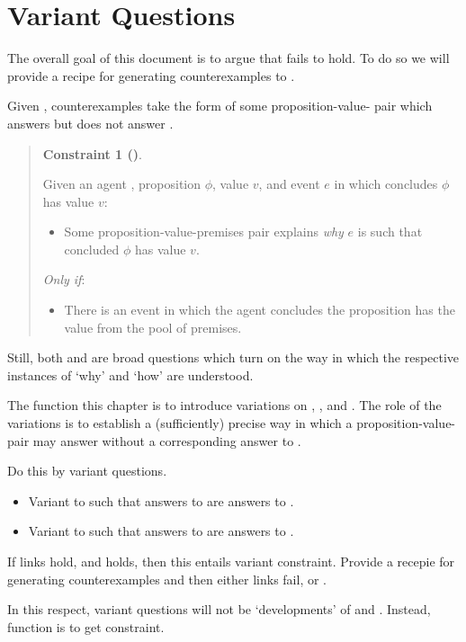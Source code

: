 \chapter{Variant Questions}
\label{cha:var}

\begin{note}
  The overall goal of this document is to argue that \issueInclusion{} fails to hold.
  To do so we will provide a recipe for generating counterexamples to \issueInclusion{}.

  Given \issueInclusion{}, counterexamples take the form of some proposition-value-\poP{} pair which answers \qWhy{} but does not answer \qHow{}.

  \begin{quote}
    \textbf{Constraint 1 (\issueInclusion{})}.

    Given an agent \vAgent{}, proposition \(\phi\), value \(v\), and event \(e\) in which \vAgent{} concludes \(\phi\) has value \(v\):
    \begin{itemize}
    \item
      Some proposition-value-premises pair explains \emph{why} \(e\) is such that \vAgent{} concluded \(\phi\) has value \(v\).
    \end{itemize}
    \emph{Only if}:
    \begin{itemize}
    \item
      There is an event in which the agent concludes the proposition has the value from the pool of premises.
    \end{itemize}
  \end{quote}

  Still, both \qWhy{} and \qHow{} are broad questions which turn on the way in which the respective instances of `why' and `how' are understood.

  The function this chapter is to introduce variations on \qWhy{}, \qHow{}, and \issueInclusion{}.
  The role of the variations is to establish a (sufficiently) precise way in which a proposition-value-\poP{} pair may answer \qWhy{} without a corresponding answer to \qHow{}.
\end{note}

\begin{note}
  Do this by variant questions.

  \begin{itemize}
  \item
    Variant to \qWhy{} such that answers to \qWhyV{} are answers to \qWhy{}.
  \item
    Variant to \qHow{} such that answers to \qHow{} are answers to \qHowV{}.
  \end{itemize}

  If links hold, and \issueConstraint{} holds, then this entails variant constraint.
  Provide a recepie for generating counterexamples and then either links fail, or \issueConstraint{}.

  In this respect, variant questions will not be `developments' of \qWhy{} and \qHow{}.
  Instead, function is to get constraint.
\end{note}


